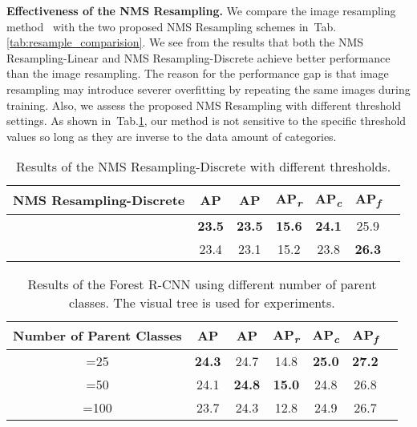 \documentclass[sigconf]{acmart}
\newcommand{\myparagraph}[1]{{\vspace{0.5em} \noindent \bf #1}}
\begin{document}
\myparagraph{Effectiveness of the NMS Resampling.} We compare the image resampling method~\cite{lvis} with the two proposed NMS Resampling schemes in~Tab.\ref{tab:resample_comparision}. We see from the results that both the NMS Resampling-Linear and NMS Resampling-Discrete achieve better performance than the image resampling. The reason for the performance gap is that image resampling may introduce severer overfitting by repeating the same images during training. Also, we assess the proposed NMS Resampling with different threshold settings. As shown in~Tab.\ref{tab:resample_ablation}, our method is not sensitive to the specific threshold values so long as they are inverse to the data amount of categories.

\begin{table}
	\centering
	\caption{Results of the NMS Resampling-Discrete with different thresholds.}
	\vspace{-3mm}
	\label{tab:resample_ablation}
	\setlength{\tabcolsep}{4pt}
	\begin{tabular}{c|cc|cccc}
		NMS Resampling-Discrete&AP&AP& AP\textsubscript{\textit{r}} & AP\textsubscript{\textit{c}} & AP\textsubscript{\textit{f}}\\
		\toprule[1.3pt]
		
		&\bf23.5 &\bf23.5&\bf15.6 &\bf24.1 &25.9 \\
	    &23.4&23.1&15.2 & 23.8 & \bf26.3
	\end{tabular}
	\vspace{-3mm}
\end{table}

\begin{table}
	\centering
	\caption{Results of the Forest R-CNN using different number of parent classes. The visual tree is used for experiments.}
	\vspace{-3mm}
	\label{tab:parent_classes_number}
	\setlength{\tabcolsep}{4pt}
	\begin{tabular}{c|cc|cccc}
		Number of Parent Classes&AP&AP& AP\textsubscript{\textit{r}} & AP\textsubscript{\textit{c}} & AP\textsubscript{\textit{f}}\\
		\toprule[1.3pt]
		
		=25&\bf24.3&24.7&14.8 &\bf25.0 &\bf27.2\\
		=50&24.1&\bf24.8&\bf15.0 & 24.8 & 26.8\\
		=100&23.7&24.3&12.8 & 24.9 & 26.7\\	
	\end{tabular}
\vspace{-3mm}
\end{table}
\end{document}
